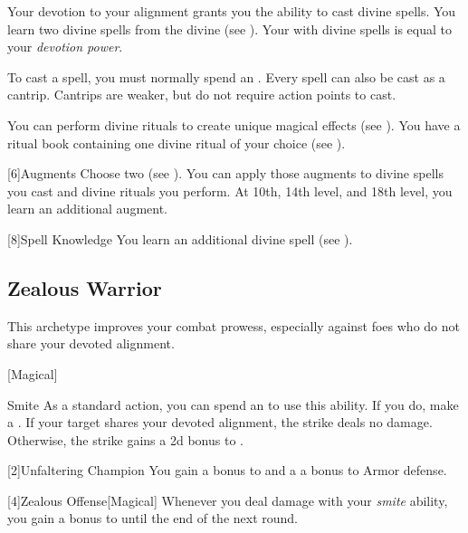         Your devotion to your alignment grants you the ability to cast divine spells.
        You learn two divine spells from the divine  (see ).
        Your  with divine spells is equal to your \textit{devotion power}.

        To cast a spell, you must normally spend an .
        Every spell can also be cast as a cantrip.
        Cantrips are weaker, but do not require action points to cast.

        You can perform divine rituals to create unique magical effects (see ).
        You have a ritual book containing one divine ritual of your choice (see ).

        [6]{Augments}
        Choose two  (see ).
        You can apply those augments to divine spells you cast and divine rituals you perform.
        At 10th, 14th level, and 18th level, you learn an additional augment.

        [8]{Spell Knowledge}
        You learn an additional divine spell (see ).

    \subsection{Zealous Warrior}
        This archetype improves your combat prowess, especially against foes who do not share your devoted alignment.

        [Magical]
        \begin{ability}{Smite}
            As a standard action, you can spend an  to use this ability.
            If you do, make a .
            If your target shares your devoted alignment, the strike deals no damage.
            Otherwise, the strike gains a \plus2d bonus to .
        \end{ability}

        [2]{Unfaltering Champion}
        You gain a  bonus to  and a a  bonus to Armor defense.

        [4]{Zealous Offense}[Magical]
        Whenever you deal damage with your \textit{smite} ability, you gain a  bonus to  until the end of the next round.


